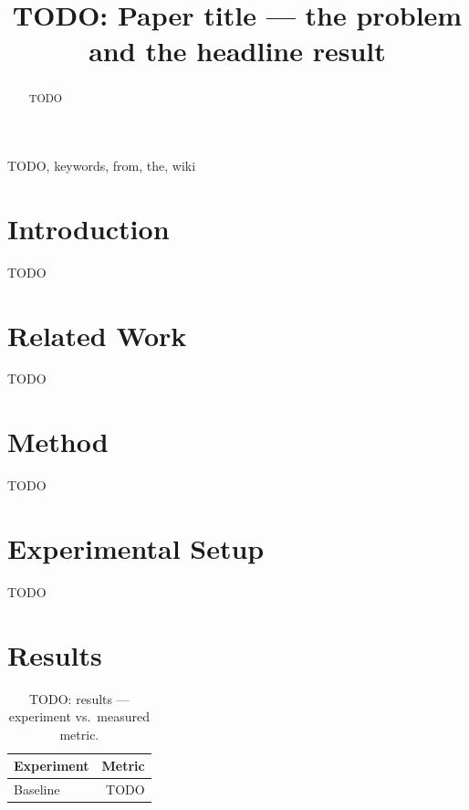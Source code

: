 \documentclass[conference]{IEEEtran}
\begin{document}
\title{TODO: Paper title --- the problem and the headline result}

\author{
}

\maketitle

\begin{abstract}
TODO
\end{abstract}

\begin{IEEEkeywords}
TODO, keywords, from, the, wiki
\end{IEEEkeywords}

\section{Introduction}
TODO

\section{Related Work}
TODO

\section{Method}
TODO

\section{Experimental Setup}
TODO

\section{Results}
\begin{table}[t]
  \centering
  \caption{TODO: results --- experiment vs.\ measured metric.}
  \begin{tabular}{lr}
    \toprule
    Experiment & Metric \\
    \midrule
    Baseline & TODO \\
    \bottomrule
  \end{tabular}
\end{table}
\end{document}
